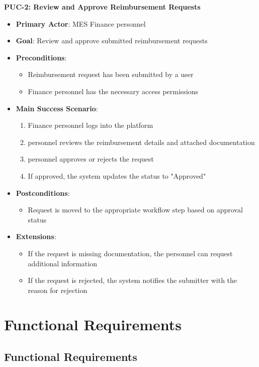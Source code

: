 \documentclass[12pt]{article}
\begin{document}
\textbf{PUC-2: Review and Approve Reimbursement Requests}
\begin{itemize}
    \item \textbf{Primary Actor}: MES Finance personnel
    \item \textbf{Goal}: Review and approve submitted reimbursement requests
    \item \textbf{Preconditions}:
    \begin{itemize}
        \item Reimbursement request has been submitted by a user
        \item Finance personnel has the necessary access permissions
    \end{itemize}
    \item \textbf{Main Success Scenario}:
    \begin{enumerate}
        \item Finance personnel logs into the platform
        \item personnel reviews the reimbursement details and attached documentation
        \item personnel approves or rejects the request
        \item If approved, the system updates the status to "Approved"
    \end{enumerate}
    \item \textbf{Postconditions}:
    \begin{itemize}
        \item Request is moved to the appropriate workflow step based on approval status
    \end{itemize}
    \item \textbf{Extensions}:
    \begin{itemize}
        \item If the request is missing documentation, the personnel can request additional information
        \item If the request is rejected, the system notifies the submitter with the reason for rejection
    \end{itemize}
\end{itemize}


\section{Functional Requirements}
\subsection{Functional Requirements}
\end{document}
